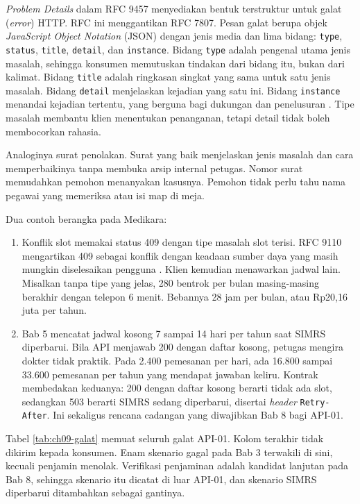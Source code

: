 \textit{Problem Details} dalam RFC 9457 menyediakan bentuk terstruktur untuk galat (\textit{error}) HTTP. RFC ini menggantikan RFC 7807. Pesan
galat berupa objek \textit{JavaScript Object Notation} (JSON) dengan jenis media  dan lima bidang: \texttt{type},
\texttt{status}, \texttt{title}, \texttt{detail}, dan \texttt{instance}. Bidang \texttt{type} adalah pengenal utama jenis masalah, sehingga konsumen
memutuskan tindakan dari bidang itu, bukan dari kalimat. Bidang \texttt{title} adalah ringkasan singkat yang sama untuk satu jenis masalah.
Bidang \texttt{detail} menjelaskan kejadian yang satu ini. Bidang \texttt{instance} menandai kejadian tertentu, yang berguna bagi dukungan dan
penelusuran \cite{rfc9457}. Tipe masalah membantu klien menentukan penanganan, tetapi detail tidak boleh membocorkan rahasia.

Analoginya surat penolakan. Surat yang baik menjelaskan jenis masalah dan cara memperbaikinya tanpa membuka arsip internal petugas. Nomor surat
memudahkan pemohon menanyakan kasusnya. Pemohon tidak perlu tahu nama pegawai yang memeriksa atau isi map di meja.

Dua contoh berangka pada Medikara:
\begin{enumerate}
  \item Konflik slot memakai status 409 dengan tipe masalah slot terisi. RFC 9110 mengartikan 409 sebagai konflik dengan keadaan sumber daya yang
        masih mungkin diselesaikan pengguna \cite{rfc9110}. Klien kemudian menawarkan jadwal lain. Misalkan tanpa tipe yang jelas, 280 bentrok per
        bulan masing-masing berakhir dengan telepon 6 menit. Bebannya 28 jam per bulan, atau Rp20,16 juta per tahun.
  \item Bab 5 mencatat jadwal kosong 7 sampai 14 hari per tahun saat SIMRS diperbarui. Bila API menjawab 200 dengan daftar kosong, petugas mengira
        dokter tidak praktik. Pada 2.400 pemesanan per hari, ada 16.800 sampai 33.600 pemesanan per tahun yang mendapat jawaban keliru. Kontrak
        membedakan keduanya: 200 dengan daftar kosong berarti tidak ada slot, sedangkan 503 berarti SIMRS sedang diperbarui, disertai
        \textit{header} \texttt{Retry-After}. Ini sekaligus rencana cadangan yang diwajibkan Bab 8 bagi API-01.
\end{enumerate}

Tabel \ref{tab:ch09-galat} memuat seluruh galat API-01. Kolom terakhir tidak dikirim kepada konsumen. Enam skenario gagal pada Bab 3 terwakili di
sini, kecuali penjamin menolak. Verifikasi penjaminan adalah kandidat lanjutan pada Bab 8, sehingga skenario itu dicatat di luar API-01, dan
skenario SIMRS diperbarui ditambahkan sebagai gantinya.

